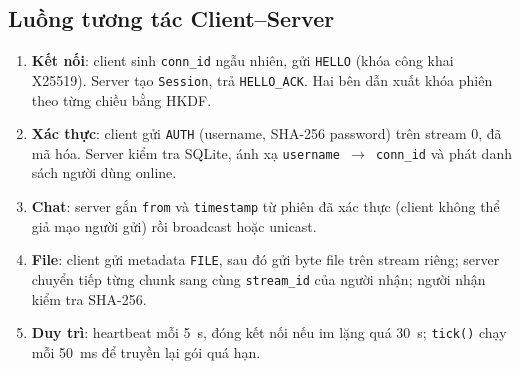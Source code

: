 \subsection{Luồng tương tác Client--Server}
\begin{enumerate}
    \item \textbf{Kết nối}: client sinh \texttt{conn\_id} ngẫu nhiên, gửi \texttt{HELLO} (khóa công khai X25519). Server tạo \texttt{Session}, trả \texttt{HELLO\_ACK}. Hai bên dẫn xuất khóa phiên theo từng chiều bằng HKDF.
    \item \textbf{Xác thực}: client gửi \texttt{AUTH} (username, SHA-256 password) trên stream 0, đã mã hóa. Server kiểm tra SQLite, ánh xạ \texttt{username $\rightarrow$ conn\_id} và phát danh sách người dùng online.
    \item \textbf{Chat}: server gắn \texttt{from} và \texttt{timestamp} từ phiên đã xác thực (client không thể giả mạo người gửi) rồi broadcast hoặc unicast.
    \item \textbf{File}: client gửi metadata \texttt{FILE}, sau đó gửi byte file trên stream riêng; server chuyển tiếp từng chunk sang cùng \texttt{stream\_id} của người nhận; người nhận kiểm tra SHA-256.
    \item \textbf{Duy trì}: heartbeat mỗi 5~s, đóng kết nối nếu im lặng quá 30~s; \texttt{tick()} chạy mỗi 50~ms để truyền lại gói quá hạn.
\end{enumerate}
